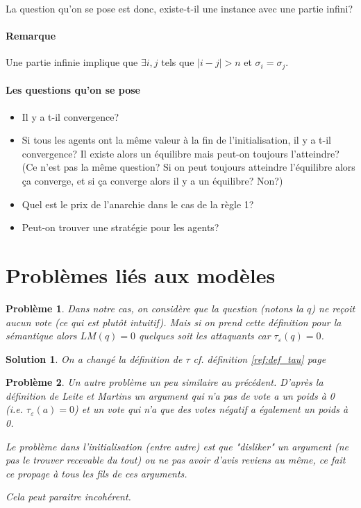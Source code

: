 \documentclass[12pt]{article}
\theoremstyle{defi}
\theoremstyle{not}
\theoremstyle{prob}
\newtheorem{problem}{Problème}[section]
\newtheorem{solution}{Solution}[problem]
\begin{document}
      La question qu'on se pose est donc, existe-t-il une instance avec une partie infini?

      \paragraph{Remarque}
        Une partie infinie implique que $\exists i, j$ tels que $|i - j| > n$ et $\sigma_i = \sigma_j$.\\





\color{black}

    \paragraph{Les questions qu'on se pose}
      \begin{itemize}
        \item Il y a t-il convergence?
        \item Si tous les agents ont la même valeur à la fin de l'initialisation, il y a t-il convergence? Il existe alors un équilibre mais peut-on toujours l'atteindre? (Ce n'est pas la même question? Si on peut toujours atteindre l'équilibre alors ça converge, et si ça converge alors il y a un équilibre? Non?)
        \item Quel est le prix de l'anarchie dans le cas de la règle 1?
        \item Peut-on trouver une stratégie pour les agents?
      \end{itemize}



  \section{Problèmes liés aux modèles}
    \begin{problem}
      Dans notre cas, on considère que la question (notons la $q$) ne reçoit aucun vote (ce qui est plutôt intuitif). Mais si on prend cette définition pour la sémantique alors $LM(q) = 0$ quelques soit les attaquants car $\tau_\varepsilon(q) = 0$.
    \end{problem}

    \begin{solution}
      On a changé la définition de $\tau$ cf. définition \ref{ref:def_tau} page \pageref{ref:def_tau}
    \end{solution}

    \begin{problem}
      Un autre problème un peu similaire au précédent.
      D'après la définition de Leite et Martins un argument qui n'a pas de vote a un poids à 0 (i.e. $\tau_\varepsilon (a) = 0$) et un vote qui n'a que des votes négatif a également un poids à 0.

      Le problème dans l'initialisation (entre autre) est que "disliker" un argument (ne pas le trouver recevable du tout) ou ne pas avoir d'avis reviens au même, ce fait ce propage à tous les fils de ces arguments.

      Cela peut paraitre incohérent.
    \end{problem}
\end{document}
